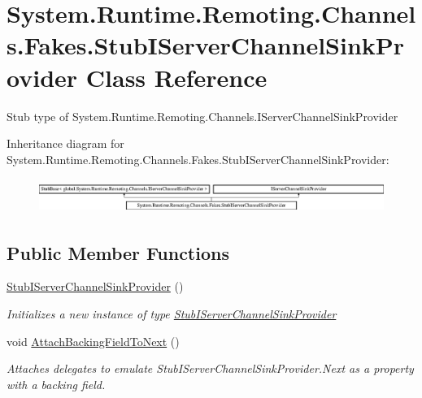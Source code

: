\hypertarget{class_system_1_1_runtime_1_1_remoting_1_1_channels_1_1_fakes_1_1_stub_i_server_channel_sink_provider}{\section{System.\-Runtime.\-Remoting.\-Channels.\-Fakes.\-Stub\-I\-Server\-Channel\-Sink\-Provider Class Reference}
\label{class_system_1_1_runtime_1_1_remoting_1_1_channels_1_1_fakes_1_1_stub_i_server_channel_sink_provider}
}


Stub type of System.\-Runtime.\-Remoting.\-Channels.\-I\-Server\-Channel\-Sink\-Provider 


Inheritance diagram for System.\-Runtime.\-Remoting.\-Channels.\-Fakes.\-Stub\-I\-Server\-Channel\-Sink\-Provider\-:\begin{figure}[H]
\begin{center}
\leavevmode
\includegraphics[height=1.117764cm]{class_system_1_1_runtime_1_1_remoting_1_1_channels_1_1_fakes_1_1_stub_i_server_channel_sink_provider}
\end{center}
\end{figure}
\subsection*{Public Member Functions}
\begin{DoxyCompactItemize}
\item 
\hyperlink{class_system_1_1_runtime_1_1_remoting_1_1_channels_1_1_fakes_1_1_stub_i_server_channel_sink_provider_ae37283036ce97a14d7a778d2730059d3}{Stub\-I\-Server\-Channel\-Sink\-Provider} ()
\begin{DoxyCompactList}\small\item\em Initializes a new instance of type \hyperlink{class_system_1_1_runtime_1_1_remoting_1_1_channels_1_1_fakes_1_1_stub_i_server_channel_sink_provider}{Stub\-I\-Server\-Channel\-Sink\-Provider}\end{DoxyCompactList}\item 
void \hyperlink{class_system_1_1_runtime_1_1_remoting_1_1_channels_1_1_fakes_1_1_stub_i_server_channel_sink_provider_ab0a7def9e1140c7cfd0983e1098fcf85}{Attach\-Backing\-Field\-To\-Next} ()
\begin{DoxyCompactList}\small\item\em Attaches delegates to emulate Stub\-I\-Server\-Channel\-Sink\-Provider.\-Next as a property with a backing field.\end{DoxyCompactList}\end{DoxyCompactItemize}
